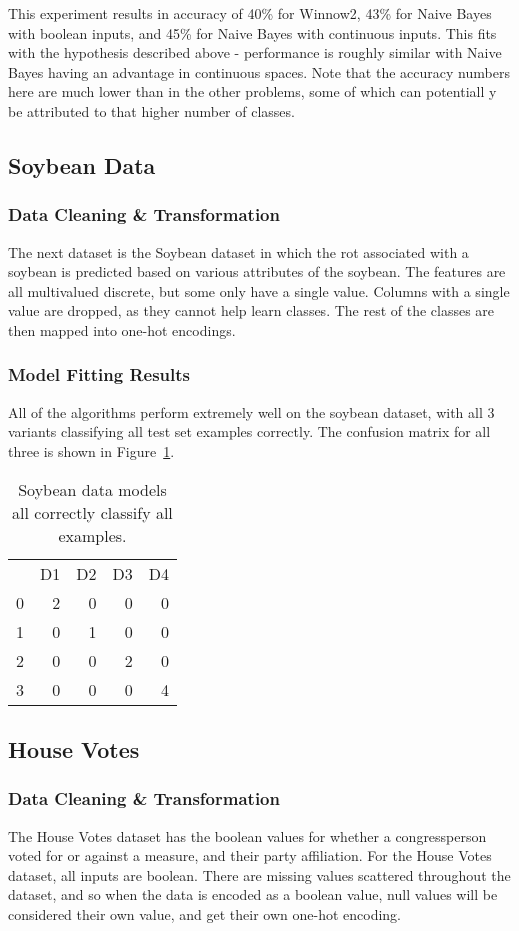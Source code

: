 \documentclass{amsart}
\begin{document}
This experiment results in accuracy of 40\% for Winnow2, 43\% for Naive Bayes with boolean inputs, and
45\% for Naive Bayes with continuous inputs. This fits with the hypothesis described above - performance is
roughly similar with Naive Bayes having an advantage in continuous spaces. Note that the accuracy numbers here
are much lower than in the other problems, some of which can potentiall y be attributed to that higher number of classes.

\subsection{Soybean Data}
\subsubsection*{Data Cleaning \& Transformation}
The next dataset is the Soybean dataset\cite{soybeandataset} in which the rot associated with a soybean is predicted
based on various attributes of the soybean. The features are all multivalued discrete, but some only have a
single value. Columns with a single value are dropped, as they cannot help learn classes. The rest of the classes
are then mapped into one-hot encodings.

\subsubsection*{Model Fitting Results}
All of the algorithms perform extremely well on the soybean dataset, with all 3 variants classifying
all test set examples correctly. The confusion matrix for all three is shown in Figure~\ref{soybean_c}.
\begin{table}
\begin{tabular}{lrrrr}
{} &  D1 &  D2 &  D3 & D4  \\
0 &  2 &  0 &  0 &  0 \\
1 &  0 &  1 &  0 &  0 \\
2 &  0 &  0 &  2 &  0 \\
3 &  0 &  0 &  0 &  4
\end{tabular}
\label{soybean_c}
\caption{Soybean data models all correctly classify all examples.}
\end{table}

\subsection{House Votes}
\subsubsection*{Data Cleaning \& Transformation}
The House Votes dataset\cite{housedataset} has the boolean values for whether a congressperson voted for or against a measure, and their party
affiliation. For the House Votes dataset, all inputs are boolean. There are missing values scattered throughout the dataset, and
so when the data is encoded as a boolean value, null values will be considered their own value, and get their own one-hot
encoding.
\end{document}
